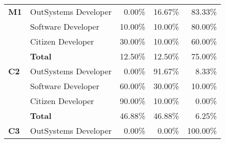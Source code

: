 \begin{table}[tb]
\begin{tabular}{@{}llrrr@{}}
    \textbf{M1}               & OutSystems Developer & 0.00\%                                                            & 16.67\%                                                                 & 83.33\%                                                       \\
                              & Software Developer   & 10.00\%                                                           & 10.00\%                                                                 & 80.00\%                                                       \\
                              & Citizen Developer    & 30.00\%                                                           & 10.00\%                                                                 & 60.00\%                                                       \\
                              & \textbf{Total}       & 12.50\%                                                           & 12.50\%                                                                 & 75.00\%                                                       \\ \midrule
    \textbf{C2}               & OutSystems Developer & 0.00\%                                                            & 91.67\%                                                                 & 8.33\%                                                        \\
                              & Software Developer   & 60.00\%                                                           & 30.00\%                                                                 & 10.00\%                                                       \\
                              & Citizen Developer    & 90.00\%                                                           & 10.00\%                                                                 & 0.00\%                                                        \\
                              & \textbf{Total}       & 46.88\%                                                           & 46.88\%                                                                 & 6.25\%                                                        \\ \midrule
    \textbf{C3}               & OutSystems Developer & 0.00\%                                                            & 0.00\%                                                                  & 100.00\%                                                      \\

\end{tabular}
\end{table}
